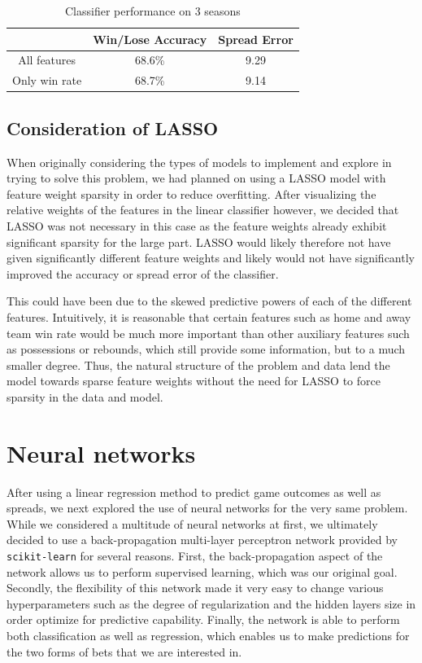 \documentclass{article}
\begin{document}
\begin{table}
  \begin{center}
    \begin{tabular}{ | c | c | c | }
      \hline
                         & Win/Lose Accuracy & Spread Error  \\ \hline
      All features       & 68.6\%            & 9.29         \\ \hline
      Only win rate      & 68.7\%            & 9.14         \\ \hline
    \end{tabular}
  \end{center}
  \caption{Classifier performance on 3 seasons}
\end{table}

\subsection{Consideration of LASSO}
When originally considering the types of models to implement and explore in trying to solve this problem, we had planned on using a LASSO model with feature weight sparsity in order to reduce overfitting. After visualizing the relative weights of the features in the linear classifier however, we decided that LASSO was not necessary in this case as the feature weights already exhibit significant sparsity for the large part. LASSO would likely therefore not have given significantly different feature weights and likely would not have significantly improved the accuracy or spread error of the classifier.

This could have been due to the skewed predictive powers of each of the different features. Intuitively, it is reasonable that certain features such as home and away team win rate would be much more important than other auxiliary features such as possessions or rebounds, which still provide some information, but to a much smaller degree. Thus, the natural structure of the problem and data lend the model towards sparse feature weights without the need for LASSO to force sparsity in the data and model.

\section{Neural networks}
After using a linear regression method to predict game outcomes as well as spreads, we next explored the use of neural networks for the very same problem. While we considered a multitude of neural networks at first, we ultimately decided to use a back-propagation multi-layer perceptron network provided by \texttt{scikit-learn} for several reasons. First, the back-propagation aspect of the network allows us to perform supervised learning, which was our original goal. Secondly, the flexibility of this network made it very easy to change various hyperparameters such as the degree of regularization and the hidden layers size in order optimize for predictive capability. Finally, the network is able to perform both classification as well as regression, which enables us to make predictions for the two forms of bets that we are interested in.
\end{document}

